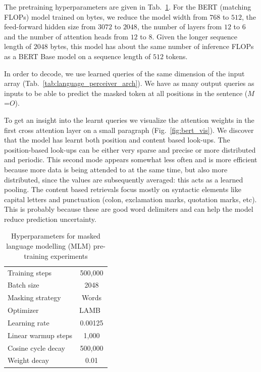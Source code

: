 \documentclass{article} %
\begin{document}
The pretraining hyperparameters are given in Tab.~\ref{tab:language_pretrain_hypers}. For the BERT (matching FLOPs) model trained on bytes, we reduce the model width from $768$ to $512$, the feed-forward hidden size from $3072$ to $2048$, the number of layers from $12$ to $6$ and the number of attention heads from $12$ to $8$. Given the longer sequence length of $2048$ bytes, this model has about the same number of inference FLOPs as a BERT Base model on a sequence length of $512$ tokens.

In order to decode, we use learned queries of the same dimension of the input array (Tab.~\ref{tab:language_perceiver_arch}). 
We have as many output queries as inputs to be able to predict the masked token at all positions in the sentence ($M$=$O$).

To get an insight into the learnt queries we visualize the attention weights in the first cross attention layer on a small paragraph (Fig.~\ref{fig:bert_vis}). We discover that the model has learnt both position and content based look-ups. The position-based look-ups can be either very sparse and precise or more distributed and periodic. This second mode appears somewhat less often and is more efficient because more data is being attended to at the same time, but also more distributed, since the values are subsequently averaged: this acts as a learned pooling. The content based retrievals focus mostly on syntactic elements like capital letters and punctuation (colon, exclamation marks, quotation marks, etc). This is probably because these are good word delimiters and can help the model reduce prediction uncertainty.
\begin{table}[h]
\centering
 \begin{tabular}{l c}
 \toprule
Training steps & 500,000 \\
Batch size & 2048 \\
Masking strategy & Words \\
\midrule
Optimizer & LAMB~\citep{you2019lamb} \\
Learning rate & 0.00125  \\
Linear warmup steps & 1,000 \\
Cosine cycle decay & 500,000 \\
Weight decay & 0.01 \\
 \bottomrule
\end{tabular}
\vspace{1mm}
\caption{\small \label{tab:language_pretrain_hypers} Hyperparameters for masked language modelling (MLM) pre-training experiments}
\end{table}
\end{document}
